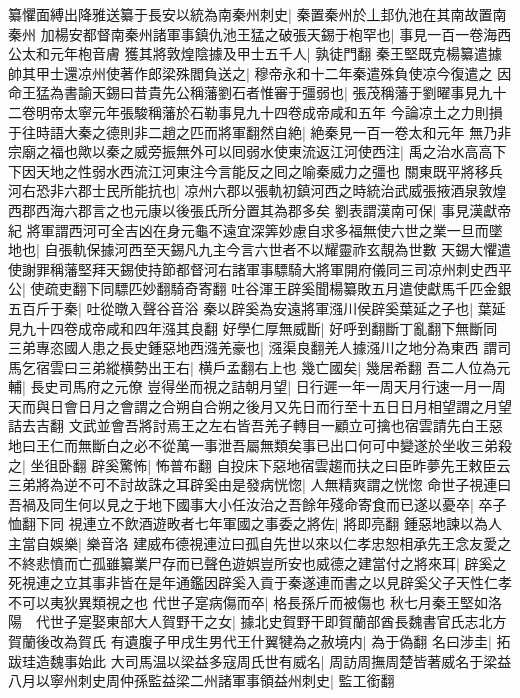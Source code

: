纂懼面縛出降雅送纂于長安以統為南秦州刺史|{
	秦置秦州於丄邽仇池在其南故置南秦州}
加楊安都督南秦州諸軍事鎮仇池王猛之破張天錫于枹罕也|{
	事見一百一卷海西公太和元年枹音膚}
獲其將敦煌陰據及甲士五千人|{
	孰徒門翻}
秦王堅既克楊纂遣據帥其甲士還凉州使著作郎梁殊閻負送之|{
	穆帝永和十二年秦遣殊負使凉今復遣之}
因命王猛為書諭天錫曰昔貴先公稱藩劉石者惟審于彊弱也|{
	張茂稱藩于劉曜事見九十二卷明帝太寧元年張駿稱藩於石勒事見九十四卷成帝咸和五年}
今論凉土之力則損于往時語大秦之德則非二趙之匹而將軍翻然自絶|{
	絶秦見一百一卷太和元年}
無乃非宗廟之福也歟以秦之威旁振無外可以囘弱水使東流返江河使西注|{
	禹之治水高高下下因天地之性弱水西流江河東注今言能反之囘之喻秦威力之彊也}
關東既平將移兵河右恐非六郡士民所能抗也|{
	凉州六郡以張軌初鎮河西之時統治武威張掖酒泉敦煌西郡西海六郡言之也元康以後張氏所分置其為郡多矣}
劉表謂漢南可保|{
	事見漢獻帝紀}
將軍謂西河可全吉凶在身元龜不遠宜深筭妙慮自求多福無使六世之業一旦而墜地也|{
	自張軌保據河西至天錫凡九主今言六世者不以耀靈祚玄靚為世數}
天錫大懼遣使謝罪稱藩堅拜天錫使持節都督河右諸軍事驃騎大將軍開府儀同三司凉州刺史西平公|{
	使疏吏翻下同驃匹妙翻騎奇寄翻}
吐谷渾王辟奚聞楊纂敗五月遣使獻馬千匹金銀五百斤于秦|{
	吐從暾入聲谷音浴}
秦以辟奚為安遠將軍漒川侯辟奚葉延之子也|{
	葉延見九十四卷成帝咸和四年漒其良翻}
好學仁厚無威斷|{
	好呼到翻斷丁亂翻下無斷同}
三弟專恣國人患之長史鍾惡地西漒羌豪也|{
	漒渠良翻羌人據漒川之地分為東西}
謂司馬乞宿雲曰三弟縱横勢出王右|{
	横戶孟翻右上也}
幾亡國矣|{
	幾居希翻}
吾二人位為元輔|{
	長史司馬府之元僚}
豈得坐而視之詰朝月望|{
	日行遲一年一周天月行速一月一周天而與日會日月之會謂之合朔自合朔之後月又先日而行至十五日日月相望謂之月望詰去吉翻}
文武並會吾將討焉王之左右皆吾羌子轉目一顧立可擒也宿雲請先白王惡地曰王仁而無斷白之必不從萬一事泄吾屬無類矣事已出口何可中變遂於坐收三弟殺之|{
	坐徂卧翻}
辟奚驚怖|{
	怖普布翻}
自投床下惡地宿雲趨而扶之曰臣昨夢先王敕臣云三弟將為逆不可不討故誅之耳辟奚由是發病恍惚|{
	人無精爽謂之恍惚}
命世子視連曰吾禍及同生何以見之于地下國事大小任汝治之吾餘年殘命寄食而已遂以憂卒|{
	卒子恤翻下同}
視連立不飲酒遊畋者七年軍國之事委之將佐|{
	將即亮翻}
鍾惡地諫以為人主當自娛樂|{
	樂音洛}
建威布德視連泣曰孤自先世以來以仁孝忠恕相承先王念友愛之不終悲憤而亡孤雖纂業尸存而已聲色遊娯豈所安也威德之建當付之將來耳|{
	辟奚之死視連之立其事非皆在是年通鑑因辟奚入貢于秦遂連而書之以見辟奚父子天性仁孝不可以夷狄異類視之也}
代世子寔病傷而卒|{
	格長孫斤而被傷也}
秋七月秦王堅如洛陽　代世子寔娶東部大人賀野干之女|{
	據北史賀野干即賀蘭部酋長魏書官氏志北方賀蘭後改為賀氏}
有遺腹子甲戌生男代王什翼犍為之赦境内|{
	為于偽翻}
名曰涉圭|{
	拓跋珪造魏事始此}
大司馬温以梁益多寇周氏世有威名|{
	周訪周撫周楚皆著威名于梁益}
八月以寧州刺史周仲孫監益梁二州諸軍事領益州刺史|{
	監工銜翻}
